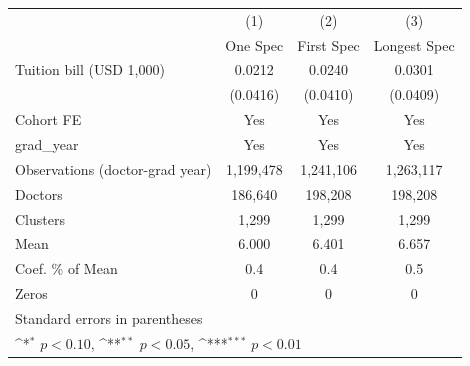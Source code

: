 {
\def\sym#1{\ifmmode^{#1}\else\(^{#1}\)\fi}
\begin{tabular}{l*{3}{c}}
\hline\hline
                    &\multicolumn{1}{c}{(1)}&\multicolumn{1}{c}{(2)}&\multicolumn{1}{c}{(3)}\\
                    &\multicolumn{1}{c}{One Spec}&\multicolumn{1}{c}{First Spec}&\multicolumn{1}{c}{Longest Spec}\\
\hline
Tuition bill (USD 1,000)&      0.0212         &      0.0240         &      0.0301         \\
                    &    (0.0416)         &    (0.0410)         &    (0.0409)         \\
[1em]
Cohort FE           &         Yes         &         Yes         &         Yes         \\
[1em]
grad\_year           &         Yes         &         Yes         &         Yes         \\
\hline
Observations (doctor-grad year)&   1,199,478         &   1,241,106         &   1,263,117         \\
Doctors             &     186,640         &     198,208         &     198,208         \\
Clusters            &       1,299         &       1,299         &       1,299         \\
Mean                &       6.000         &       6.401         &       6.657         \\
Coef. \% of Mean    &         0.4         &         0.4         &         0.5         \\
Zeros               &           0         &           0         &           0         \\
\hline\hline
\multicolumn{4}{l}{\footnotesize Standard errors in parentheses}\\
\multicolumn{4}{l}{\footnotesize \sym{*} \(p<0.10\), \sym{**} \(p<0.05\), \sym{***} \(p<0.01\)}\\
\end{tabular}
}
